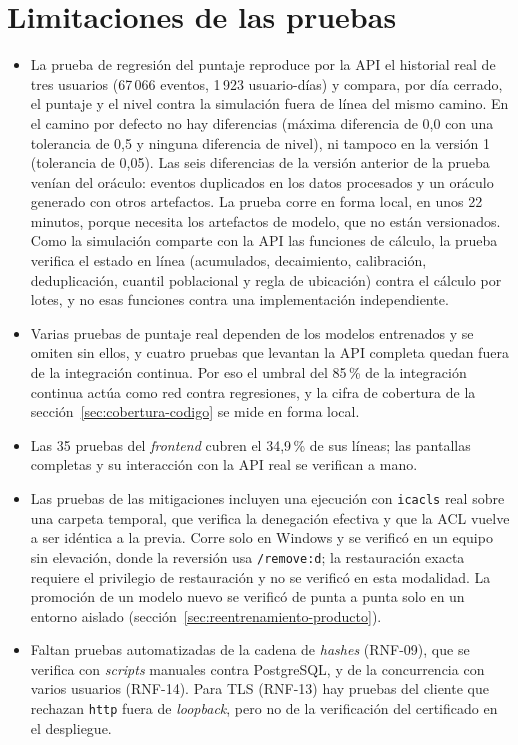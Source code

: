 \section{Limitaciones de las pruebas}
\label{sec:limitaciones-pruebas}
\begin{itemize}
	\item La prueba de regresión del puntaje reproduce por la API el historial real de tres usuarios (67\,066 eventos, 1\,923 usuario-días) y compara, por día cerrado, el puntaje y el nivel contra la simulación fuera de línea del mismo camino. En el camino por defecto no hay diferencias (máxima diferencia de 0,0 con una tolerancia de 0,5 y ninguna diferencia de nivel), ni tampoco en la versión 1 (tolerancia de 0,05). Las seis diferencias de la versión anterior de la prueba venían del oráculo: eventos duplicados en los datos procesados y un oráculo generado con otros artefactos. La prueba corre en forma local, en unos 22 minutos, porque necesita los artefactos de modelo, que no están versionados. Como la simulación comparte con la API las funciones de cálculo, la prueba verifica el estado en línea (acumulados, decaimiento, calibración, deduplicación, cuantil poblacional y regla de ubicación) contra el cálculo por lotes, y no esas funciones contra una implementación independiente.
	\item Varias pruebas de puntaje real dependen de los modelos entrenados y se omiten sin ellos, y cuatro pruebas que levantan la API completa quedan fuera de la integración continua. Por eso el umbral del 85\,\% de la integración continua actúa como red contra regresiones, y la cifra de cobertura de la sección~\ref{sec:cobertura-codigo} se mide en forma local.
	\item Las 35 pruebas del \emph{frontend} cubren el 34,9\,\% de sus líneas; las pantallas completas y su interacción con la API real se verifican a mano.
	\item Las pruebas de las mitigaciones incluyen una ejecución con \texttt{icacls} real sobre una carpeta temporal, que verifica la denegación efectiva y que la ACL vuelve a ser idéntica a la previa. Corre solo en Windows y se verificó en un equipo sin elevación, donde la reversión usa \texttt{/remove:d}; la restauración exacta requiere el privilegio de restauración y no se verificó en esta modalidad. La promoción de un modelo nuevo se verificó de punta a punta solo en un entorno aislado (sección~\ref{sec:reentrenamiento-producto}).
	\item Faltan pruebas automatizadas de la cadena de \emph{hashes} (RNF-09), que se verifica con \emph{scripts} manuales contra PostgreSQL, y de la concurrencia con varios usuarios (RNF-14). Para TLS (RNF-13) hay pruebas del cliente que rechazan \texttt{http} fuera de \emph{loopback}, pero no de la verificación del certificado en el despliegue.

\end{itemize}
